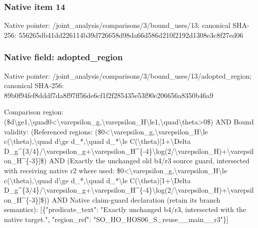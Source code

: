 \documentclass[10pt,a4paper]{article}
\begin{document}
\subsubsection{Native item 14}
Native pointer: /joint\_\allowbreak{}analysis/comparisons/3/bound\_\allowbreak{}uses/13; canonical SHA-256: 556265db41dd226114b39d726658d98da66d586d210f2192d1308e3c8f27ed06

\subsubsection{Native field: adopted\_\allowbreak{}region}
Native pointer: /joint\_\allowbreak{}analysis/comparisons/3/bound\_\allowbreak{}uses/13/adopted\_\allowbreak{}region; canonical SHA-256: 89b0f94fef8dddf7da8f97ff56de6cf1f2f285435e53f90e206656a8350b46a9

\begingroup\raggedright\sloppy Comparison region:\allowbreak{} (\$d\textbackslash{}ge1,\allowbreak{}\textbackslash{}quad0<\textbackslash{}varepsilon\_\allowbreak{}g,\allowbreak{}\textbackslash{}varepsilon\_\allowbreak{}H\textbackslash{}le1,\allowbreak{}\textbackslash{}quad\textbackslash{}theta>0\$) AND Bound validity:\allowbreak{} (Referenced regions:\allowbreak{} (\$0<\textbackslash{}varepsilon\_\allowbreak{}g,\allowbreak{}\textbackslash{}varepsilon\_\allowbreak{}H\textbackslash{}le c(\textbackslash{}theta),\allowbreak{}\textbackslash{}quad d\textbackslash{}ge d\_\allowbreak{}*,\allowbreak{}\textbackslash{}quad d\_\allowbreak{}*\textbackslash{}le C(\textbackslash{}theta)[1+\textbackslash{}Delta D\_\allowbreak{}g\textasciicircum{}\{3/\allowbreak{}4\}/\allowbreak{}\textbackslash{}varepsilon\_\allowbreak{}g+\textbackslash{}varepsilon\_\allowbreak{}H\textasciicircum{}\{-4\}\textbackslash{}log(2/\allowbreak{}\textbackslash{}varepsilon\_\allowbreak{}H)+\textbackslash{}varepsilon\_\allowbreak{}H\textasciicircum{}\{-3\}]\$) AND (Exactly the unchanged old b4/\allowbreak{}r3 source guard,\allowbreak{} intersected with receiving native r2 where used:\allowbreak{} \$0<\textbackslash{}varepsilon\_\allowbreak{}g,\allowbreak{}\textbackslash{}varepsilon\_\allowbreak{}H\textbackslash{}le c(\textbackslash{}theta),\allowbreak{}\textbackslash{}quad d\textbackslash{}ge d\_\allowbreak{}*,\allowbreak{}\textbackslash{}quad d\_\allowbreak{}*\textbackslash{}le C(\textbackslash{}theta)[1+\textbackslash{}Delta D\_\allowbreak{}g\textasciicircum{}\{3/\allowbreak{}4\}/\allowbreak{}\textbackslash{}varepsilon\_\allowbreak{}g+\textbackslash{}varepsilon\_\allowbreak{}H\textasciicircum{}\{-4\}\textbackslash{}log(2/\allowbreak{}\textbackslash{}varepsilon\_\allowbreak{}H)+\textbackslash{}varepsilon\_\allowbreak{}H\textasciicircum{}\{-3\}]\$)) AND Native claim-guard declaration (retain its branch semantics):\allowbreak{} [\{"predicate\_\allowbreak{}text":\allowbreak{} "Exactly unchanged b4/\allowbreak{}r3,\allowbreak{} intersected with the native target.",\allowbreak{} "region\_\allowbreak{}ref":\allowbreak{} "SO\_\allowbreak{}HO\_\allowbreak{}HOS06\_\allowbreak{}S\_\allowbreak{}reuse\_\allowbreak{}\_\allowbreak{}main\_\allowbreak{}\_\allowbreak{}r3"\}]\par\endgroup
\end{document}
